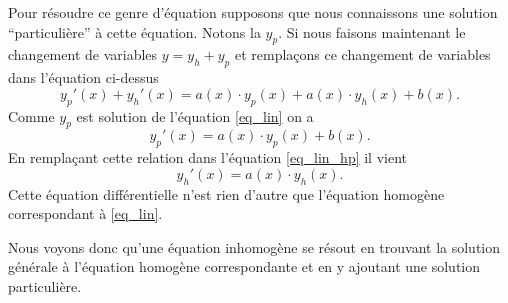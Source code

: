 \documentclass[a4paper,12pt]{book}
\begin{document}
Pour résoudre ce genre d'équation supposons que nous connaissons une solution ``particulière'' à cette équation. Notons la
$y_p$. Si nous faisons maintenant le changement de variables $y=y_h+y_p$ et remplaçons
ce changement de variables dans l'équation ci-dessus
\begin{equation}
 y_p'(x)+y_h'(x)=a(x)\cdot y_p(x)+a(x)\cdot y_h(x)+b(x).\label{eq_lin_hp}
 \end{equation}
Comme $y_p$ est solution de l'équation \eqref{eq_lin} on a 
\begin{equation}
 y_p'(x)=a(x)\cdot y_p(x)+b(x).
\end{equation}
En remplaçant cette relation dans l'équation \eqref{eq_lin_hp} il vient 
\begin{equation}
 y_h'(x)=a(x)\cdot y_h(x).
\end{equation}
Cette équation différentielle n'est rien d'autre que l'équation homogène correspondant à \eqref{eq_lin}.

Nous voyons donc qu'une équation inhomogène se résout en trouvant la solution générale à l'équation homogène
correspondante et en y ajoutant une solution particulière.
 
\end{document}
